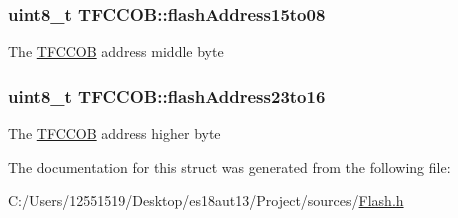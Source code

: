 \subsubsection[{flash\+Address15to08}]{\setlength{\rightskip}{0pt plus 5cm}uint8\+\_\+t T\+F\+C\+C\+O\+B\+::flash\+Address15to08}\label{struct_t_f_c_c_o_b_a96b625dc57b3ecdf9ceca8045404bc6b}
The \hyperlink{struct_t_f_c_c_o_b}{T\+F\+C\+C\+O\+B} address middle byte \hypertarget{struct_t_f_c_c_o_b_a41e7ea5bf2b3dd4e0decbbbae999ca94}{}
\subsubsection[{flash\+Address23to16}]{\setlength{\rightskip}{0pt plus 5cm}uint8\+\_\+t T\+F\+C\+C\+O\+B\+::flash\+Address23to16}\label{struct_t_f_c_c_o_b_a41e7ea5bf2b3dd4e0decbbbae999ca94}
The \hyperlink{struct_t_f_c_c_o_b}{T\+F\+C\+C\+O\+B} address higher byte 

The documentation for this struct was generated from the following file\+:\begin{DoxyCompactItemize}
\item 
C\+:/\+Users/12551519/\+Desktop/es18aut13/\+Project/sources/\hyperlink{_flash_8h}{Flash.\+h}\end{DoxyCompactItemize}
